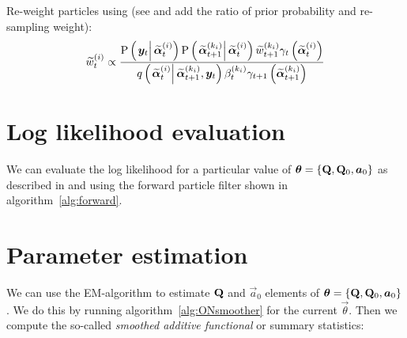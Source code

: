 \begin{algorithm}[H]
\begin{algorithmic}[1]
\EndProcedure
%
\State Re-weight particles using {\footnotesize (see \citet[page 72]{briers10} and add the ratio of prior probability and re-sampling weight)}:
\StateX \begin{equation}\label{eqn:backwardWeight}
	\particB{w}{t}{i} \propto \frac{
		\propC{\vec{y}_t}{\particB{\vec{\alpha}}{t}{i}}
		\propC{\particB{\vec{\alpha}}{t + 1}{k_i}}{\particB{\vec{\alpha}}{t}{i}}
		\particB{w}{t + 1}{k_i}
		\gamma_t\Lparen{\particB{\vec{\alpha}}{t}{i}}
	}{ %
		\IDC{\particB{\vec{\alpha}}{t}{i}}{\particB{\vec{\alpha}}{t + 1}{k_i}, \vec{y}_t}
		\partic{\beta}{t}{k_i}
		\gamma_{t + 1}\Lparen{\particB{\vec{\alpha}}{t + 1}{k_i}}
	}
\end{equation}
\EndProcedure
\EndFor
\end{algorithmic}
\end{algorithm}

\newpage

\section{Log likelihood evaluation}
We can evaluate the log likelihood for a particular value of $\bm{\theta} = \left\{ \mathbf{Q}, \mathbf{Q}_0, \bm{a}_0\right\}$ as described in \citet[page 5]{doucet09} and \citet[page 193]{malik11} using the forward particle filter shown in algorithm~\ref{alg:forward}.

\section{Parameter estimation}
We can use the EM-algorithm \citep{dempster77} to estimate $\mathbf{Q}$ and $\vec{a}_0$ elements of $\bm{\theta} = \left\{ \mathbf{Q}, \mathbf{Q}_0, \bm{a}_0\right\}$. We do this by running algorithm~\ref{alg:ONsmoother} for the current $\vec{\theta}$. Then we compute the so-called \emph{smoothed additive functional} or summary statistics:

